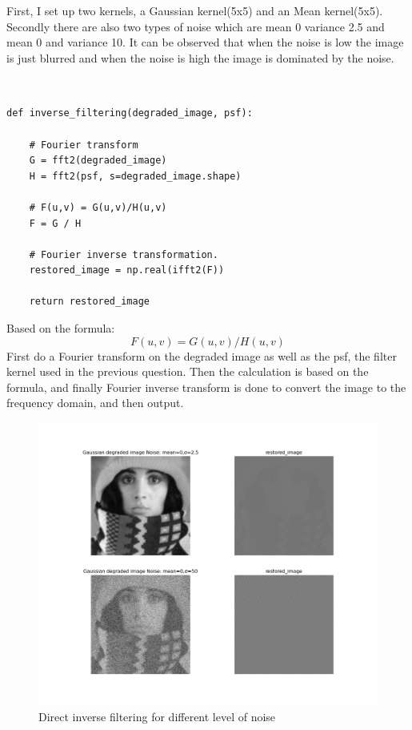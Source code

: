 \documentclass[12pt]{article}
\begin{document}
First, I set up two kernels, a Gaussian kernel(5x5) and an Mean kernel(5x5). Secondly there are also two types of noise which are mean 0 variance 2.5 and mean 0 and variance 10.
It can be observed that when the noise is low the image is just blurred and when the noise is high the image is dominated by the noise.
\subsection{}
\begin{lstlisting}
    
def inverse_filtering(degraded_image, psf):

    # Fourier transform
    G = fft2(degraded_image)
    H = fft2(psf, s=degraded_image.shape)

    # F(u,v) = G(u,v)/H(u,v)
    F = G / H

    # Fourier inverse transformation.
    restored_image = np.real(ifft2(F))

    return restored_image  

\end{lstlisting}

Based on the formula:
\[F(u,v) = G(u,v)/H(u,v)\]
First do a Fourier transform on the degraded image as well as the psf, the filter kernel used in the previous question. Then the calculation is based on the formula, and finally Fourier inverse transform is done to convert the image to the frequency domain, and then output.
\begin{figure}[h]
    \centering
    \includegraphics[width=1\textwidth]{pics/a5_2.2.png} 
    \caption{Direct inverse filtering for different level of noise}
\end{figure}
\end{document}
